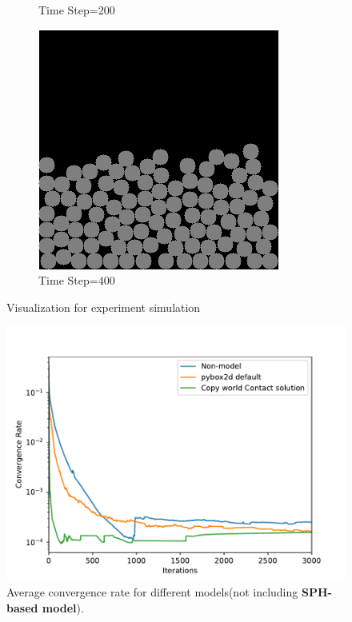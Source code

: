 \begin{figure}[!h]
\begin{subfigure}[b]{0.3\textwidth}
            \caption{Time Step=$200$}
        \end{subfigure}
        \begin{subfigure}[b]{0.3\textwidth}
            \includegraphics[width=\textwidth]{Figures/sim3.png}
            \caption{Time Step=$400$}
        \end{subfigure}
        \caption{Visualization for experiment simulation}
        \label{fig:simvi}
    \end{figure}
    \begin{figure}[!h]
        \centering
        \includegraphics[width=\textwidth]{Figures/nosph}
        \caption{Average convergence rate for different models(not including \textbf{SPH-based model}).}
        \label{fg:nosph}
    \end{figure}
